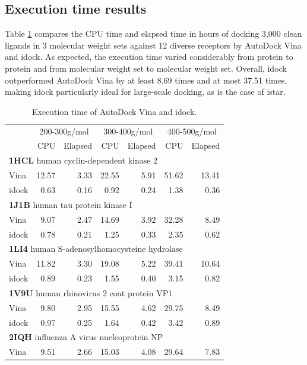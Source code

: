 \subsection{Execution time results}

Table \ref{istar:ExecutionTime} compares the CPU time and elapsed time in hours of docking 3,000 clean ligands in 3 molecular weight sets against 12 diverse receptors by AutoDock Vina and idock. As expected, the execution time varied considerably from protein to protein and from molecular weight set to molecular weight set. Overall, idock outperformed AutoDock Vina by at least 8.69 times and at most 37.51 times, making idock particularly ideal for large-scale docking, as is the case of istar.

\begin{table}
\caption{Execution time of AutoDock Vina and idock.}
\label{istar:ExecutionTime}
\begin{tabular}{lrrrrrr}
\hline
& \multicolumn{2}{c}{200-300g/mol} & \multicolumn{2}{c}{300-400g/mol} & \multicolumn{2}{c}{400-500g/mol}\\
& CPU & Elapsed & CPU & Elapsed & CPU & Elapsed\\
\hline
\multicolumn{7}{l}{\textbf{1HCL} human cyclin-dependent kinase 2}\\
Vina  & 12.57 &  3.33 & 22.55 &  5.91 & 51.62 & 13.41\\
idock &  0.63 &  0.16 &  0.92 &  0.24 &  1.38 &  0.36\\
\multicolumn{7}{l}{\textbf{1J1B} human tau protein kinase I}\\
Vina  &  9.07 &  2.47 & 14.69 &  3.92 & 32.28 &  8.49\\
idock &  0.78 &  0.21 &  1.25 &  0.33 &  2.35 &  0.62\\
\multicolumn{7}{l}{\textbf{1LI4} human S-adenosylhomocysteine hydrolase}\\
Vina  & 11.82 &  3.30 & 19.08 &  5.22 & 39.41 & 10.64\\
idock &  0.89 &  0.23 &  1.55 &  0.40 &  3.15 &  0.82\\
\multicolumn{7}{l}{\textbf{1V9U} human rhinovirus 2 coat protein VP1}\\
Vina  &  9.80 &  2.95 & 15.55 &  4.62 & 29.75 &  8.49\\
idock &  0.97 &  0.25 &  1.64 &  0.42 &  3.42 &  0.89\\
\multicolumn{7}{l}{\textbf{2IQH} influenza A virus nucleoprotein NP}\\
Vina  &  9.51 &  2.66 & 15.03 &  4.08 & 29.64 &  7.83\\

\end{tabular}
\end{table}
